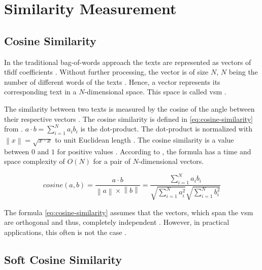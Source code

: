 
\section{Similarity Measurement}\label{sec:similarity-measurement}

\cite{EmbDist2015}

\subsection{Cosine Similarity}\label{subsec:cosine-similarity}

In the traditional bag-of-words approach the texts are represented as vectors of \ac{tfidf} coefficients \cite{soft_cosine2017}.
Without further processing, the vector is of size $N$, $N$ being the number of different words of the texts \cite{soft_cosine2017}.
Hence, a vector represents its corresponding text in a $N$-dimensional space.
This space is called \ac{vsm} \cite{soft_cosine2014}.

The similarity between two texts is measured by the cosine of the angle between their respective vectors \cite{soft_cosine2014}.
The cosine similarity is defined in \autoref{eq:cosine-similarity} from \cite{soft_cosine2014}.
$a \cdot b = \sum_{i=1}^{N}a_{i}b_{i}$ is the dot-product.
The dot-product is normalized with $\left\| x \right\| = \sqrt{x \cdot x}$ to unit Euclidean length \cite{soft_cosine2014}.
The cosine similarity is a value between $0$ and $1$ for positive values \cite{soft_cosine2014}.
According to \citeauthor{soft_cosine2014}, the formula has a time and space complexity of $O(N)$ for a pair of $N$-dimensional vectors.

\begin{equation}
    cosine(a,b) = \frac{a \cdot b}{\left\| a \right\| \times \left\| b \right\|} = \frac{\sum_{i=1}^{N}a_{i}b_{i}}{\sqrt{\sum_{i=1}^{N}{a}^2_{i}}\sqrt{\sum_{i=1}^{N}{b}^2_{i}}}
    \label{eq:cosine-similarity}
\end{equation}

The formula \autoref{eq:cosine-similarity} assumes that the vectors, which span the \ac{vsm} are orthogonal and thus, 
completely independent \cite{soft_cosine2014}.
However, in practical applications, this often is not the case \cite{soft_cosine2014}.


\subsection{Soft Cosine Similarity}\label{subsec:soft-cosine-similarity}

